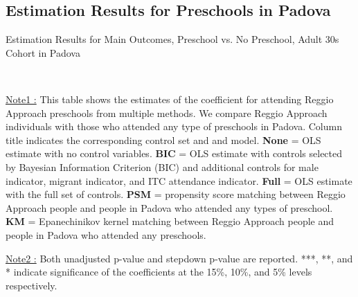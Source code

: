 \subsection{Estimation Results for Preschools in Padova} \label{subsection:padova-estimation}


\begin{table}[H] \caption{Estimation Results for Main Outcomes, Preschool vs. No Preschool, Adult 30s Cohort in Padova} \label{ols-M-adult30-reg-pres-padova}
\scalebox{0.62}{}
\vspace{1ex} \\
\footnotesize\raggedright{\underline{Note1 :} This table shows the estimates of the coefficient for attending Reggio Approach preschools from multiple methods. We compare Reggio Approach individuals with those who attended any type of preschools in Padova. Column title indicates the corresponding control set and and model. \textbf{None} = OLS estimate with no control variables. \textbf{BIC} = OLS estimate with controls selected by Bayesian Information Criterion (BIC) and additional controls for male indicator, migrant indicator, and ITC attendance indicator. \textbf{Full} = OLS estimate with the full set of controls. \textbf{PSM} =  propensity score matching between Reggio Approach people and people in Padova who attended any types of preschool. \textbf{KM} = Epanechinikov kernel matching between Reggio Approach people and people in Padova who attended any preschools.}

\footnotesize\raggedright{\underline{Note2 :} Both unadjusted p-value and stepdown p-value are reported. ***, **, and * indicate significance of the coefficients at the 15\%, 10\%, and 5\% levels respectively.}
\end{table}




